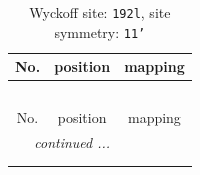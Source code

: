 \documentclass[fleqn,8pt]{jsarticle}
\begin{document}
\renewcommand{\arraystretch}{1.2}
\begin{longtable}{ccc}
\caption{Wyckoff site: {\tt 192l}, site symmetry: {\tt 11'}}
 \\
 \hline \hline
No. & position & mapping \\ \hline \endfirsthead

\multicolumn{2}{l}{\tablename\ \thetable{}} \\
 \hline \hline
No. & position & mapping \\ \hline \endhead

 \hline \hline
\multicolumn{2}{r}{\footnotesize\it continued ...} \\ \endfoot

 \hline \hline
\multicolumn{2}{r}{} \\ \endlastfoot


\end{longtable}
\end{document}

